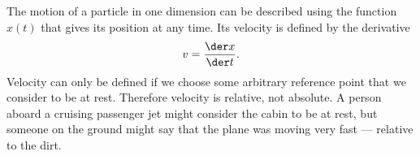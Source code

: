 The motion of a particle in one dimension can be described using the
function $x(t)$ that gives its position at any time. Its velocity is
defined by the derivative
\begin{equation}
  v = \frac{\der x}{\der t}.
\end{equation}
Velocity can only be defined if we choose some arbitrary reference point that we consider
to be at rest. Therefore velocity is relative, not absolute. A person aboard a cruising
passenger jet might consider the cabin to be at rest, but someone on the ground might
say that the plane was moving very fast --- relative to the dirt.

